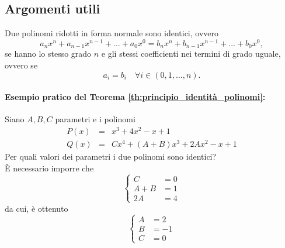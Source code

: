 \subsection{Argomenti utili}
\begin{theorem}\label{th:principio_identità_polinomi}
		Due polinomi ridotti in forma normale sono identici, ovvero
		\begin{equation*}
			a_nx^n+a_{n-1}x^{n-1}+\hdots+a_0x^0 = b_nx^n+b_{n-1}x^{n-1}+\hdots+b_0x^0,
		\end{equation*}
		se hanno lo stesso grado $n$ e gli stessi coefficienti nei termini di grado uguale, ovvero se
		\begin{equation*}
			a_i=b_i\quad\forall i\in(0,1,\hdots, n).
		\end{equation*}
\end{theorem}
\paragraph{Esempio pratico del Teorema \ref{th:principio_identità_polinomi}:} Siano $A,B,C$ parametri e i \gls{polinomi}
\begin{equation*}
	\begin{matrix}
		P(x) &=& x^3 + 4x^2-x+1\\
		Q(x) &=& Cx^4 + (A+B)x^3+2Ax^2-x+1
	\end{matrix}
\end{equation*}
Per quali valori dei parametri i due polinomi sono identici?\\
È necessario imporre che
\begin{equation*}
	\begin{cases}
		C&=0\\
		A+B &= 1\\
		2A &= 4
	\end{cases}
\end{equation*}
da cui, è ottenuto
\begin{equation*}
	\begin{cases}
		A &= 2\\
		B &= - 1\\
		C&=0
	\end{cases}
\end{equation*}


